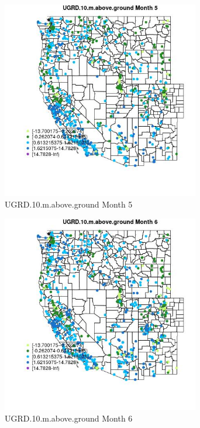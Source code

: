 \begin{figure} 
\centering  
\includegraphics[width=0.77\textwidth]{Code_Outputs/Report_ML_input_PM25_Step4_part_f_de_duplicated_aveswNAs_MapObsMo5UGRD10maboveground.jpg} 
\caption{\label{fig:Report_ML_input_PM25_Step4_part_f_de_duplicated_aveswNAsMapObsMo5UGRD10maboveground}UGRD.10.m.above.ground Month 5} 
\end{figure} 
 

\clearpage 

\begin{figure} 
\centering  
\includegraphics[width=0.77\textwidth]{Code_Outputs/Report_ML_input_PM25_Step4_part_f_de_duplicated_aveswNAs_MapObsMo6UGRD10maboveground.jpg} 
\caption{\label{fig:Report_ML_input_PM25_Step4_part_f_de_duplicated_aveswNAsMapObsMo6UGRD10maboveground}UGRD.10.m.above.ground Month 6} 
\end{figure} 
 

